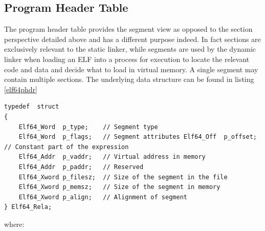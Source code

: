 \subsection{Program Header Table} The program header table provides the segment view as opposed to the section perspective detailed above and has a different purpose indeed. In fact sections are exclusively relevant to the static linker, while segments are used by the dynamic linker when loading an ELF into a process for execution to locate the relevant code and data and decide what to load in virtual memory. A single segment may contain multiple sections. The underlying data structure can be found in listing \ref{elf64phdr}
\begin{lstlisting}[style=ansic, caption={Program Header}, label=elf64phdr]
typedef  struct 
{
    Elf64_Word 	p_type;    // Segment type
    Elf64_Word 	p_flags;   // Segment attributes Elf64_Off 	p_offset;  // Constant part of the expression
    Elf64_Addr 	p_vaddr;   // Virtual address in memory 
    Elf64_Addr  p_paddr;   // Reserved
    Elf64_Xword p_filesz;  // Size of the segment in the file
    Elf64_Xword p_memsz;   // Size of the segment in memory
    Elf64_Xword p_align;   // Alignment of segment
} Elf64_Rela; 
\end{lstlisting} 
where:
